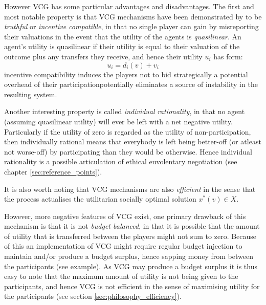 \DIFdelend However VCG has some particular advantages and disadvantages.
The first and most notable property is that VCG mechanisms have been demonstrated by \cite{roberts1979characterization, Lavi2008} to be \textit{truthful} or \textit{incentive compatible}, in \DIFaddbegin {}\DIFaddend that no single player can \DIFdelbegin {}\DIFdelend \DIFaddbegin {}\DIFaddend gain by misreporting their valuations in the event that \DIFaddbegin {}\DIFaddend the utility of the agents is \textit{quasilinear}.
An agent's utility is quasilinear if their utility is equal to their valuation of the outcome plus any transfers they receive, and hence their utility $u_i$ has form:
$$ u_i = d_i(v)+v_i $$
\DIFdelbegin {}\DIFdelend \DIFaddbegin {}\DIFaddend incentive compatibility induces the players not to bid strategically \DIFdelbegin {}\DIFdelend \DIFaddbegin {}\DIFaddend a potential overhead of their participation\DIFdelbegin {}\DIFdelend \DIFaddbegin {}\DIFaddend potentially eliminates a source of instability in the resulting system.

Another interesting property is called \textit{individual rationality}, in that no agent (assuming quasilinear utility) will ever be left with a net negative utility. Particularly if the utility of zero is regarded as the utility of non-participation, then individually rational means that everybody is left being better-off (or atleast not worse-off) by participating than they would be otherwise. Hence individual rationality is a possible articulation of ethical euvolentary negotiation (see chapter \ref{sec:reference_points}).

It is also worth noting that VCG mechanisms are also \textit{efficient} in the sense that the process actualises the utilitarian socially optimal solution $x^*(v) \in X$.

However, more negative features of VCG exist, one primary drawback of this mechanism is that it is not \textit{budget balanced}, in that it is possible that the amount of utility that is transferred between the players might not sum to zero.
Because of this an implementation of VCG might require regular budget injection to maintain and/or produce a budget surplus, hence sapping money from between the participants (see example).
As VCG may produce a budget surplus it is thus easy to note that the maximum amount of utility is not being given to the participants, and hence VCG is not efficient in the sense of maximising utility for the participants (see section \ref{sec:philosophy_efficiency}).
\DIFdelbegin {}\DIFdelend \DIFaddbegin 

